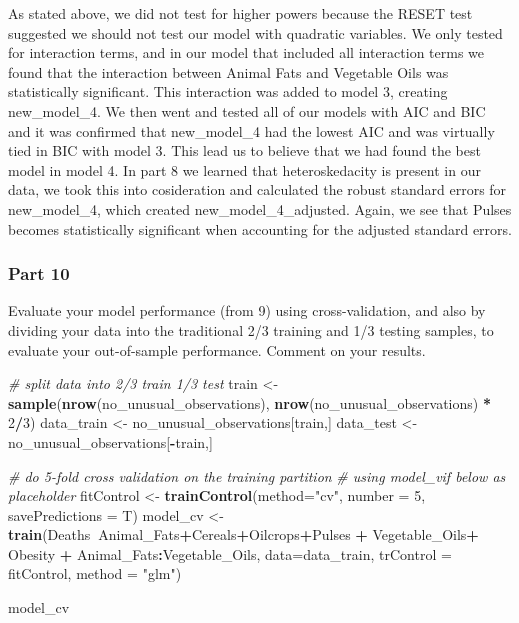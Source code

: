 \documentclass[
]{article}
\newenvironment{Shaded}{\begin{snugshade}}{\end{snugshade}}
\newcommand{\CommentTok}[1]{\textcolor[rgb]{0.56,0.35,0.01}{\textit{#1}}}
\newcommand{\DataTypeTok}[1]{\textcolor[rgb]{0.13,0.29,0.53}{#1}}
\newcommand{\DecValTok}[1]{\textcolor[rgb]{0.00,0.00,0.81}{#1}}
\newcommand{\KeywordTok}[1]{\textcolor[rgb]{0.13,0.29,0.53}{\textbf{#1}}}
\newcommand{\NormalTok}[1]{#1}
\newcommand{\OperatorTok}[1]{\textcolor[rgb]{0.81,0.36,0.00}{\textbf{#1}}}
\newcommand{\StringTok}[1]{\textcolor[rgb]{0.31,0.60,0.02}{#1}}
\begin{document}
As stated above, we did not test for higher powers because the RESET
test suggested we should not test our model with quadratic variables. We
only tested for interaction terms, and in our model that included all
interaction terms we found that the interaction between Animal Fats and
Vegetable Oils was statistically significant. This interaction was added
to model 3, creating new\_model\_4. We then went and tested all of our
models with AIC and BIC and it was confirmed that new\_model\_4 had the
lowest AIC and was virtually tied in BIC with model 3. This lead us to
believe that we had found the best model in model 4. In part 8 we
learned that heteroskedacity is present in our data, we took this into
cosideration and calculated the robust standard errors for
new\_model\_4, which created new\_model\_4\_adjusted. Again, we see that
Pulses becomes statistically significant when accounting for the
adjusted standard errors.

\hypertarget{part-10}{%
\subsubsection{Part 10}\label{part-10}}

Evaluate your model performance (from 9) using cross-validation, and
also by dividing your data into the traditional 2/3 training and 1/3
testing samples, to evaluate your out-of-sample performance. Comment on
your results.

\begin{Shaded}
\begin{Highlighting}[]
\CommentTok{# split data into 2/3 train 1/3 test}
\NormalTok{train <-}\StringTok{ }\KeywordTok{sample}\NormalTok{(}\KeywordTok{nrow}\NormalTok{(no_unusual_observations), }\KeywordTok{nrow}\NormalTok{(no_unusual_observations) }\OperatorTok{*}\StringTok{ }\DecValTok{2}\OperatorTok{/}\DecValTok{3}\NormalTok{)}
\NormalTok{data_train <-}\StringTok{ }\NormalTok{no_unusual_observations[train,]}
\NormalTok{data_test <-}\StringTok{ }\NormalTok{no_unusual_observations[}\OperatorTok{-}\NormalTok{train,]}

\CommentTok{# do 5-fold cross validation on the training partition}
\CommentTok{# using model_vif below as placeholder}
\NormalTok{fitControl <-}\StringTok{ }\KeywordTok{trainControl}\NormalTok{(}\DataTypeTok{method=}\StringTok{"cv"}\NormalTok{, }\DataTypeTok{number =} \DecValTok{5}\NormalTok{, }\DataTypeTok{savePredictions =}\NormalTok{ T)}
\NormalTok{model_cv <-}\StringTok{ }\KeywordTok{train}\NormalTok{(Deaths}\OperatorTok{~}\NormalTok{Animal_Fats}\OperatorTok{+}\NormalTok{Cereals}\OperatorTok{+}\NormalTok{Oilcrops}\OperatorTok{+}\NormalTok{Pulses }\OperatorTok{+}\StringTok{ }\NormalTok{Vegetable_Oils}\OperatorTok{+}
\StringTok{                    }\NormalTok{Obesity }\OperatorTok{+}\StringTok{ }\NormalTok{Animal_Fats}\OperatorTok{:}\NormalTok{Vegetable_Oils, }\DataTypeTok{data=}\NormalTok{data_train,  }
                  \DataTypeTok{trControl =}\NormalTok{ fitControl, }\DataTypeTok{method =} \StringTok{"glm"}\NormalTok{)}

\NormalTok{model_cv}
\end{Highlighting}
\end{Shaded}
\end{document}
